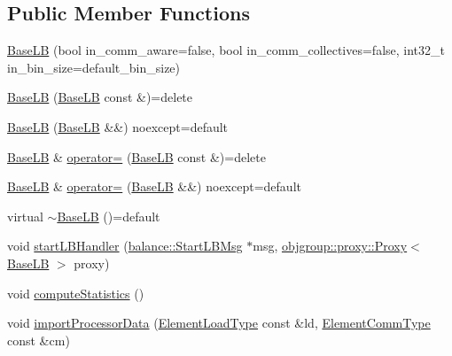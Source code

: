 \subsection*{Public Member Functions}
\begin{DoxyCompactItemize}
\item 
\hyperlink{structvt_1_1vrt_1_1collection_1_1lb_1_1_base_l_b_addef25b03975034a0936c515a2942d43}{Base\+LB} (bool in\+\_\+comm\+\_\+aware=false, bool in\+\_\+comm\+\_\+collectives=false, int32\+\_\+t in\+\_\+bin\+\_\+size=default\+\_\+bin\+\_\+size)
\item 
\hyperlink{structvt_1_1vrt_1_1collection_1_1lb_1_1_base_l_b_af34c68c8ecf1341189a67c3405036d16}{Base\+LB} (\hyperlink{structvt_1_1vrt_1_1collection_1_1lb_1_1_base_l_b}{Base\+LB} const \&)=delete
\item 
\hyperlink{structvt_1_1vrt_1_1collection_1_1lb_1_1_base_l_b_a1d1ae8a311e14e27b26624caee930535}{Base\+LB} (\hyperlink{structvt_1_1vrt_1_1collection_1_1lb_1_1_base_l_b}{Base\+LB} \&\&) noexcept=default
\item 
\hyperlink{structvt_1_1vrt_1_1collection_1_1lb_1_1_base_l_b}{Base\+LB} \& \hyperlink{structvt_1_1vrt_1_1collection_1_1lb_1_1_base_l_b_a94be0abcbc47bf6a3f3685f94dd5d4cb}{operator=} (\hyperlink{structvt_1_1vrt_1_1collection_1_1lb_1_1_base_l_b}{Base\+LB} const \&)=delete
\item 
\hyperlink{structvt_1_1vrt_1_1collection_1_1lb_1_1_base_l_b}{Base\+LB} \& \hyperlink{structvt_1_1vrt_1_1collection_1_1lb_1_1_base_l_b_a1e092a34c8e4eda0a05ab3a2f5a9ae45}{operator=} (\hyperlink{structvt_1_1vrt_1_1collection_1_1lb_1_1_base_l_b}{Base\+LB} \&\&) noexcept=default
\item 
virtual \hyperlink{structvt_1_1vrt_1_1collection_1_1lb_1_1_base_l_b_a2d4e31b7ae227886a24443334114269e}{$\sim$\+Base\+LB} ()=default
\item 
void \hyperlink{structvt_1_1vrt_1_1collection_1_1lb_1_1_base_l_b_a26d684f9f07e7635886b12d0235e081e}{start\+L\+B\+Handler} (\hyperlink{structvt_1_1vrt_1_1collection_1_1balance_1_1_start_l_b_msg}{balance\+::\+Start\+L\+B\+Msg} $\ast$msg, \hyperlink{structvt_1_1objgroup_1_1proxy_1_1_proxy}{objgroup\+::proxy\+::\+Proxy}$<$ \hyperlink{structvt_1_1vrt_1_1collection_1_1lb_1_1_base_l_b}{Base\+LB} $>$ proxy)
\item 
void \hyperlink{structvt_1_1vrt_1_1collection_1_1lb_1_1_base_l_b_a44ab2755595d800e50576fa53bee7d91}{compute\+Statistics} ()
\item 
void \hyperlink{structvt_1_1vrt_1_1collection_1_1lb_1_1_base_l_b_a0a3c06181a20994a9263e680f3385bd1}{import\+Processor\+Data} (\hyperlink{structvt_1_1vrt_1_1collection_1_1lb_1_1_base_l_b_aa286d31a0820a8fc9218ccb858368fca}{Element\+Load\+Type} const \&ld, \hyperlink{structvt_1_1vrt_1_1collection_1_1lb_1_1_base_l_b_ac3f8560bfe41aa593eb7d5bd1241cc4c}{Element\+Comm\+Type} const \&cm)

\end{DoxyCompactItemize}
